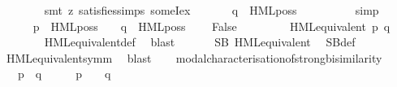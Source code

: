 \begin{isabellebody}
\ \ \ \ \ \ \isamarkupfalse%
\ {\isacharparenleft}{\kern0pt}smt\ {\isacharparenleft}{\kern0pt}z{}{\isacharparenright}{\kern0pt}\ satisfies{\isachardot}{\kern0pt}simps{\isacharparenleft}{\kern0pt}{}{\isacharparenright}{\kern0pt}\ someI{\isacharunderscore}{\kern0pt}ex{\isacharparenright}{\kern0pt}\isanewline
\ \ \ \ \isamarkupfalse%
\ {\isacartoucheopen}{\isasymnot}\ q\ {\isasymTurnstile}\ HML{\isacharunderscore}{\kern0pt}poss\ {\isasymalpha}\ {\isacharquery}{\kern0pt}{\isasymphi}{\isacartoucheclose}\isanewline
\ \ \ \ \ \ \isamarkupfalse%
\ simp\isanewline
\ \ \isanewline
\ \ \ \ \isamarkupfalse%
\ {\isacartoucheopen}p\ {\isasymTurnstile}\ HML{\isacharunderscore}{\kern0pt}poss\ {\isasymalpha}\ {\isacharquery}{\kern0pt}{\isasymphi}{\isacartoucheclose}\ {\isacartoucheopen}{\isasymnot}\ q\ {\isasymTurnstile}\ HML{\isacharunderscore}{\kern0pt}poss\ {\isasymalpha}\ {\isacharquery}{\kern0pt}{\isasymphi}{\isacartoucheclose}\ \isamarkupfalse%
\ False\ \isanewline
\ \ \ \ \ \ \isamarkupfalse%
\ {\isacartoucheopen}HML{\isacharunderscore}{\kern0pt}equivalent\ p\ q{\isacartoucheclose}\ \isanewline
\ \ \ \ \ \ \isamarkupfalse%
\ HML{\isacharunderscore}{\kern0pt}equivalent{\isacharunderscore}{\kern0pt}def\ \isamarkupfalse%
\ blast\isanewline
\ \ \isacommand{{\isacharbraceright}{\kern0pt}}\isamarkupfalse%
\isanewline
\isanewline
\ \ \isamarkupfalse%
\ {\isacartoucheopen}SB\ HML{\isacharunderscore}{\kern0pt}equivalent{\isacartoucheclose}\ \isamarkupfalse%
\ SB{\isacharunderscore}{\kern0pt}def\ \isanewline
\ \ \ \ \isamarkupfalse%
\ HML{\isacharunderscore}{\kern0pt}equivalent{\isacharunderscore}{\kern0pt}symm\ \isamarkupfalse%
\ blast\isanewline
{}\isamarkupfalse%
\isanewline
\isanewline
\ \ \isanewline
{}\isamarkupfalse%
\ modal{\isacharunderscore}{\kern0pt}characterisation{\isacharunderscore}{\kern0pt}of{\isacharunderscore}{\kern0pt}strong{\isacharunderscore}{\kern0pt}bisimilarity{\isacharcolon}{\kern0pt}\ \isanewline
\ \ \ {\isacartoucheopen}p\ {\isasymleftrightarrow}\ q\ \ {\isasymLongleftrightarrow}\ \ {\isacharparenleft}{\kern0pt}{\isasymforall}\ {\isasymphi}{\isachardot}{\kern0pt}\ p\ {\isasymTurnstile}\ {\isasymphi}\ {\isasymlongleftrightarrow}\ q\ {\isasymTurnstile}\ {\isasymphi}{\isacharparenright}{\kern0pt}{\isacartoucheclose}\isanewline
{}\isamarkupfalse%
\isanewline

\end{isabellebody}
